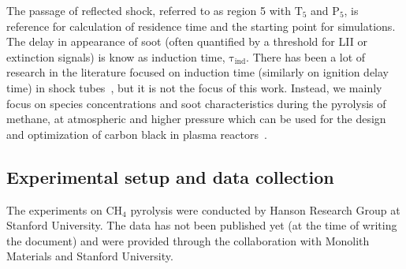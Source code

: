 
The passage of reflected shock, referred to as region 5 with $\mathrm{T_5}$ and $\mathrm{P_5}$, is reference for calculation of residence time and the starting point for simulations. The delay in appearance of soot (often quantified by a threshold for LII or extinction signals) is know as induction time, $\mathrm{\tau_{ind}}$. There has been a lot of research in the literature focused on induction time (similarly on ignition delay time) in shock tubes~\citep{fussey1978shock}, but it is not the focus of this work. Instead, we mainly focus on  species concentrations and soot characteristics during the pyrolysis of methane, at atmospheric and higher pressure which can be used for the design and optimization of carbon black in plasma reactors~\citep{fulcheri2023energy}. 

%
%

\subsection{Experimental setup and data collection}

The experiments on $\mathrm{CH_4}$ pyrolysis were conducted by Hanson Research Group at Stanford University. The data has not been published yet (at the time of writing the document) and were provided through the collaboration with Monolith Materials and Stanford University.

